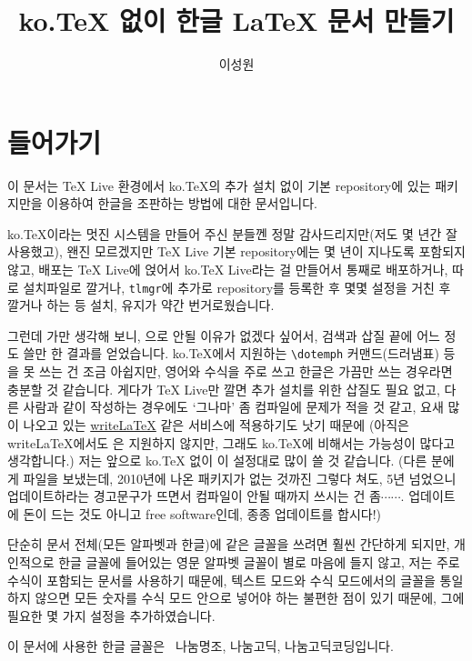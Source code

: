\documentclass[a4paper]{article}
\numberwithin{equation}{section}
\newcommand{\homit}{\ensuremath{\cdots\cdots}}
\begin{document}
\title{ko.\TeX{} 없이 한글 \LaTeX{} 문서 만들기}
\author{이성원}
\maketitle



\section{들어가기}

이 문서는 \TeX{} Live 환경에서 ko.\TeX{}의 추가 설치 없이 기본 repository에 있는 패키지만을 이용하여 한글을 조판하는 방법에 대한 문서입니다.

ko.\TeX{}이라는 멋진 시스템을 만들어 주신 분들껜 정말 감사드리지만(저도 몇 년간 잘 사용했고), 왠진 모르겠지만 \TeX{} Live 기본 repository에는 몇 년이 지나도록 포함되지 않고, 배포는 \TeX{} Live에 얹어서 ko.\TeX{} Live라는 걸 만들어서 통째로 배포하거나, 따로 설치파일로 깔거나, \texttt{tlmgr}에 추가로 repository를 등록한 후 몇몇 설정을 거친 후 깔거나 하는 등 설치, 유지가 약간 번거로웠습니다.

그런데 가만 생각해 보니, \XeTeX{}으로 안될 이유가 없겠다 싶어서, 검색과 삽질 끝에 어느 정도 쓸만 한 결과를 얻었습니다. ko.\TeX{}에서 지원하는 \verb+\dotemph+ 커맨드(드러냄표) 등을 못 쓰는 건 조금 아쉽지만, 영어와 수식을 주로 쓰고 한글은 가끔만 쓰는 경우라면 충분할 것 같습니다.
게다가 \TeX{} Live만 깔면 추가 설치를 위한 삽질도 필요 없고, 다른 사람과 같이 작성하는 경우에도 `그나마' 좀 컴파일에 문제가 적을 것 같고, 요새 많이 나오고 있는 \href{http://www.writelatex.com/}{write\LaTeX} 같은 서비스에 적용하기도 낫기 때문에 (아직은 write\LaTeX{}에서도 \XeTeX{}은 지원하지 않지만, 그래도 ko.\TeX{}에 비해서는 가능성이 많다고 생각합니다.) 저는 앞으로 ko.\TeX{} 없이 이 설정대로 많이 쓸 것 같습니다.
(다른 분에게 파일을 보냈는데, 2010년에 나온 패키지가 없는 것까진 그렇다 쳐도, 5년 넘었으니 업데이트하라는 경고문구가 뜨면서 컴파일이 안될 때까지 쓰시는 건 좀\homit.
업데이트에 돈이 드는 것도 아니고 free software인데, 종종 업데이트를 합시다!)

단순히 문서 전체(모든 알파벳과 한글)에 같은 글꼴을 쓰려면 훨씬 간단하게 되지만, 개인적으로 한글 글꼴에 들어있는 영문 알파벳 글꼴이 별로 마음에 들지 않고, 저는 주로 수식이 포함되는 문서를 사용하기 때문에, 텍스트 모드와 수식 모드에서의 글꼴을 통일하지 않으면 모든 숫자를 수식 모드 안으로 넣어야 하는 불편한 점이 있기 때문에, 그에 필요한 몇 가지 설정을 추가하였습니다.

이 문서에 사용한 한글 글꼴은\ { 나눔명조}, { 나눔고딕}, { 나눔고딕코딩}입니다.
\end{document}
